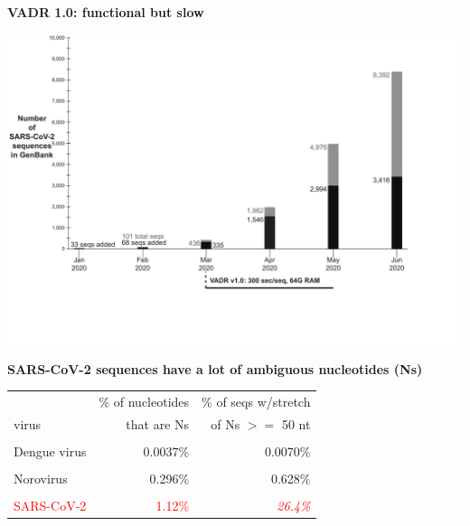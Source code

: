 \documentclass[landscape]{slides}
\begin{document}
\begin{slide}
\begin{center}
\textbf{VADR 1.0: functional but slow}

\includegraphics[width=10.5in]{figs/sars-counts-jan2020-may2020-slide2}
\end{center}

\vfill
\end{slide}
\begin{slide}
\begin{center}
\textbf{SARS-CoV-2 sequences have a lot of ambiguous nucleotides (Ns)}
\end{center}

\begin{center}
\begin{tabular}{lrr}
            & \% of nucleotides & \% of seqs w/stretch \\
  virus     & that are Ns       & of Ns $>=$ 50 nt     \\ \hline
& & \\
Dengue virus  & 0.0037\%        & 0.0070\%             \\
& & \\                    
Norovirus     & 0.296\%         & 0.628\%             \\
& & \\                    
\textcolor{red}{SARS-CoV-2}    & \textcolor{red}{1.12\%}          & \textcolor{red}{\emph{26.4\%}}       \\
\end{tabular}
\end{center}
\vfill

\vfill
\end{slide}
\end{document}
